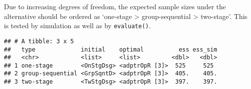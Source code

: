 \documentclass[
]{book}
\newenvironment{Shaded}{\begin{snugshade}}{\end{snugshade}}
\newcommand{\CommentTok}[1]{\textcolor[rgb]{0.56,0.35,0.01}{\textit{#1}}}
\newcommand{\DataTypeTok}[1]{\textcolor[rgb]{0.13,0.29,0.53}{#1}}
\newcommand{\DecValTok}[1]{\textcolor[rgb]{0.00,0.00,0.81}{#1}}
\newcommand{\FloatTok}[1]{\textcolor[rgb]{0.00,0.00,0.81}{#1}}
\newcommand{\KeywordTok}[1]{\textcolor[rgb]{0.13,0.29,0.53}{\textbf{#1}}}
\newcommand{\NormalTok}[1]{#1}
\newcommand{\OperatorTok}[1]{\textcolor[rgb]{0.81,0.36,0.00}{\textbf{#1}}}
\newcommand{\StringTok}[1]{\textcolor[rgb]{0.31,0.60,0.02}{#1}}
\begin{document}
Due to increasing degrees of freedom, the expected sample sizes under the
alternative should be ordered as `one-stage \textgreater{} group-sequential \textgreater{} two-stage'.
This is tested by simulation as well as by \texttt{evaluate()}.

\begin{Shaded}
\end{Shaded}

\begin{verbatim}
## # A tibble: 3 x 5
##   type             initial    optimal          ess ess_sim
##   <chr>            <list>     <list>         <dbl>   <dbl>
## 1 one-stage        <OnStgDsg> <adptrOpR [3]>  525     525 
## 2 group-sequential <GrpSqntD> <adptrOpR [3]>  405.    405.
## 3 two-stage        <TwStgDsg> <adptrOpR [3]>  397.    397.
\end{verbatim}
\end{document}
